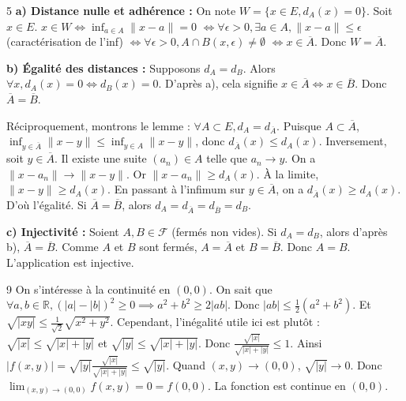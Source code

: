 \begin{correction}{5}
 \textbf{a) Distance nulle et adhérence :}
On note $W = \{x \in E, d_{A}(x) = 0\}$.
Soit $x \in E$.
$x \in W \iff \inf_{a \in A} \|x-a\| = 0$
$\iff \forall \epsilon > 0, \exists a \in A, \|x-a\| \le \epsilon$ (caractérisation de l'inf)
$\iff \forall \epsilon > 0, A \cap B(x, \epsilon) \neq \emptyset$
$\iff x \in \overline{A}$.
Donc $W = \overline{A}$.

\textbf{b) Égalité des distances :}
Supposons $d_{A} = d_{B}$.
Alors $\forall x, d_{A}(x)=0 \iff d_{B}(x)=0$.
D'après a), cela signifie $x \in \overline{A} \iff x \in \overline{B}$. Donc $\overline{A} = \overline{B}$.

Réciproquement, montrons le lemme : $\forall A \subset E, d_{A} = d_{\overline{A}}$.
Puisque $A \subset \overline{A}$, $\inf_{y \in \overline{A}} \|x-y\| \le \inf_{y \in A} \|x-y\|$, donc $d_{\overline{A}}(x) \le d_{A}(x)$.
Inversement, soit $y \in \overline{A}$. Il existe une suite $(a_{n}) \in A$ telle que $a_{n} \to y$.
On a $\|x-a_{n}\| \to \|x-y\|$.
Or $\|x-a_{n}\| \ge d_{A}(x)$. À la limite, $\|x-y\| \ge d_{A}(x)$.
En passant à l'infimum sur $y \in \overline{A}$, on a $d_{\overline{A}}(x) \ge d_{A}(x)$.
D'où l'égalité.
Si $\overline{A} = \overline{B}$, alors $d_{A} = d_{\overline{A}} = d_{\overline{B}} = d_{B}$.

\textbf{c) Injectivité :}
Soient $A, B \in \mathcal{F}$ (fermés non vides).
Si $d_{A} = d_{B}$, alors d'après b), $\overline{A} = \overline{B}$.
Comme $A$ et $B$ sont fermés, $A = \overline{A}$ et $B = \overline{B}$.
Donc $A = B$. L'application est injective.
\end{correction}

\begin{correction}{9}
 On s'intéresse à la continuité en $(0,0)$.
On sait que $\forall a,b \in \mathbb{R}, (|a|-|b|)^{2} \ge 0 \implies a^{2}+b^{2} \ge 2|ab|$.
Donc $|ab| \le \frac{1}{2}(a^{2}+b^{2})$.
Et $\sqrt{|xy|} \le \frac{1}{\sqrt{2}} \sqrt{x^{2}+y^{2}}$.
Cependant, l'inégalité utile ici est plutôt : $\sqrt{|x|} \le \sqrt{|x|+|y|}$ et $\sqrt{|y|} \le \sqrt{|x|+|y|}$.
Donc $\frac{\sqrt{|x|}}{\sqrt{|x|+|y|}} \le 1$.
Ainsi $|f(x,y)| = \sqrt{|y|} \frac{\sqrt{|x|}}{\sqrt{|x|+|y|}} \le \sqrt{|y|}$.
Quand $(x,y) \to (0,0)$, $\sqrt{|y|} \to 0$.
Donc $\lim_{(x,y) \to (0,0)} f(x,y) = 0 = f(0,0)$.
La fonction est continue en $(0,0)$.
\end{correction}

